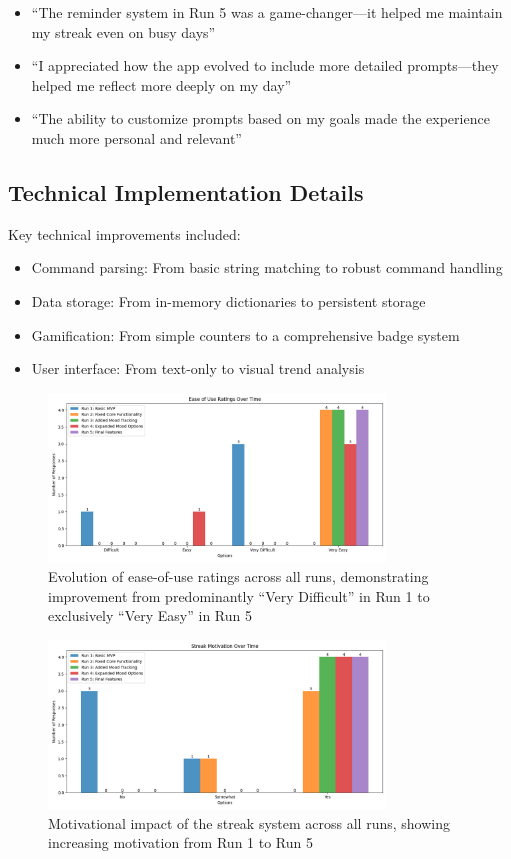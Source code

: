 \documentclass{article} %
\begin{document}
\begin{itemize}
    \item ``The reminder system in Run 5 was a game-changer---it helped me maintain my streak even on busy days''
    \item ``I appreciated how the app evolved to include more detailed prompts---they helped me reflect more deeply on my day''
    \item ``The ability to customize prompts based on my goals made the experience much more personal and relevant''
\end{itemize}

\subsection{Technical Implementation Details}
Key technical improvements included:
\begin{itemize}
    \item Command parsing: From basic string matching to robust command handling
    \item Data storage: From in-memory dictionaries to persistent storage
    \item Gamification: From simple counters to a comprehensive badge system
    \item User interface: From text-only to visual trend analysis
\end{itemize}

\begin{figure}[h]
\centering
\includegraphics[width=0.8\textwidth]{ease_of_use.png}
\caption{Evolution of ease-of-use ratings across all runs, demonstrating improvement from predominantly ``Very Difficult'' in Run 1 to exclusively ``Very Easy'' in Run 5}
\label{fig:ease_of_use}
\end{figure}

\begin{figure}[h]
\centering
\includegraphics[width=0.8\textwidth]{streak_motivation.png}
\caption{Motivational impact of the streak system across all runs, showing increasing motivation from Run 1 to Run 5}
\label{fig:motivation}
\end{figure}
\end{document}
